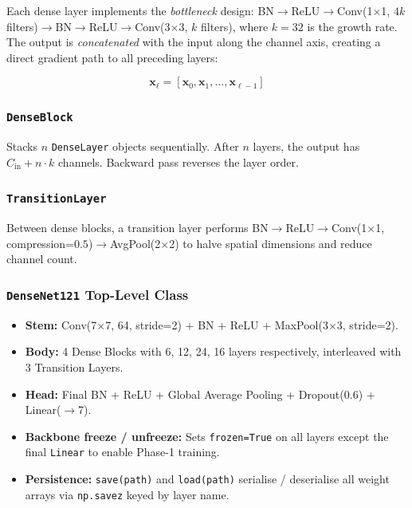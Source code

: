 \documentclass[12pt,a4paper]{report}
\begin{document}
Each dense layer implements the \emph{bottleneck} design: BN$\to$ReLU$\to$Conv(1$\times$1, $4k$ filters)$\to$BN$\to$ReLU$\to$Conv(3$\times$3, $k$ filters), where $k=32$ is the growth rate. The output is \emph{concatenated} with the input along the channel axis, creating a direct gradient path to all preceding layers:

\[
  \mathbf{x}_\ell = [\mathbf{x}_0, \mathbf{x}_1, \ldots, \mathbf{x}_{\ell-1}]
\]

\subsubsection{\texttt{DenseBlock}}

Stacks $n$ \texttt{DenseLayer} objects sequentially. After $n$ layers, the output has $C_{\text{in}} + n \cdot k$ channels. Backward pass reverses the layer order.

\subsubsection{\texttt{TransitionLayer}}

Between dense blocks, a transition layer performs BN$\to$ReLU$\to$Conv(1$\times$1, compression=$0.5$)$\to$AvgPool(2$\times$2) to halve spatial dimensions and reduce channel count.

\subsubsection{\texttt{DenseNet121} Top-Level Class}

\begin{itemize}[nosep]
  \item \textbf{Stem:} Conv(7$\times$7, 64, stride=2) + BN + ReLU + MaxPool(3$\times$3, stride=2).
  \item \textbf{Body:} 4 Dense Blocks with 6, 12, 24, 16 layers respectively, interleaved with 3 Transition Layers.
  \item \textbf{Head:} Final BN + ReLU + Global Average Pooling + Dropout(0.6) + Linear($\to$7).
  \item \textbf{Backbone freeze / unfreeze:} Sets \texttt{frozen=True} on all layers except the final \texttt{Linear} to enable Phase-1 training.
  \item \textbf{Persistence:} \texttt{save(path)} and \texttt{load(path)} serialise / deserialise all weight arrays via \texttt{np.savez} keyed by layer name.
\end{itemize}
\end{document}
